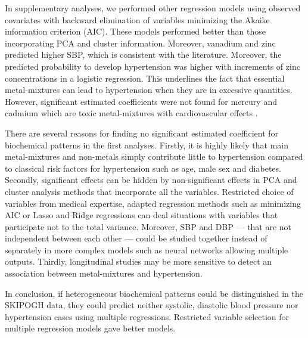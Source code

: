 \documentclass[a4paper]{book}
\begin{document}
In supplementary analyses, we performed other regression models using observed covariates with backward elimination of variables minimizing the Akaike information criterion (AIC). These models performed better than those incorporating PCA and cluster information. Moreover, vanadium and zinc predicted higher SBP, which is consistent with the literature. Moreover, the predicted probability to develop hypertension was higher with increments of zinc concentrations in a logistic regression. This underlines the fact that essential metal-mixtures can lead to hypertension when they are in excessive quantities. However, significant estimated coefficients were not found for mercury and cadmium which are toxic metal-mixtures with cardiovascular effects \cite{cosselman_environmental_2015}.

There are several reasons for finding no significant estimated coefficient for biochemical patterns in the first analyses. Firstly, it is highly likely that main metal-mixtures and non-metals simply contribute little to hypertension compared to classical risk factors for hypertension such as age, male sex and diabetes. Secondly, significant effects can be hidden by non-significant effects in PCA and cluster analysis methods that incorporate all the variables. Restricted choice of variables from medical expertise, adapted regression methods such as minimizing AIC or Lasso and Ridge regressions can deal situations with variables that participate not to the total variance. Moreover, SBP and DBP --- that are not independent between each other --- could be studied together instead of separately in more complex models such as neural networks allowing multiple outputs. Thirdly, longitudinal studies may be more sensitive to detect an association between metal-mixtures and hypertension.

\newpage

In conclusion, if heterogeneous biochemical patterns could be distinguished in the SKIPOGH data, they could predict neither systolic, diastolic blood pressure nor hypertension cases using multiple regressions. Restricted variable selection for multiple regression models gave better models.





\appendix
\appendixpage
\addappheadtotoc
\end{document}
